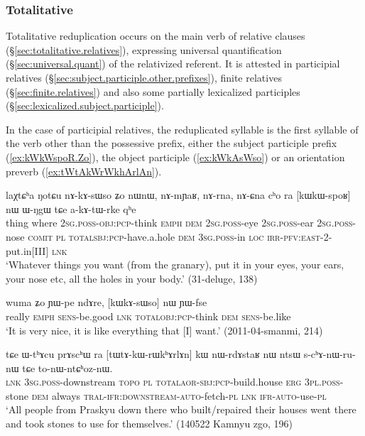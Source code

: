 \subsubsection{Totalitative} \label{sec:totalitative.redp}
Totalitative reduplication occurs on the main verb of relative clauses (§\ref{sec:totalitative.relatives}), expressing universal quantification (§\ref{sec:universal.quant}) of the relativized referent. It is attested in participial relatives (§\ref{sec:subject.participle.other.prefixes}), finite relatives (§\ref{sec:finite.relatives}) and also some partially lexicalized participles (§\ref{sec:lexicalized.subject.participle}).

In the case of participial relatives, the reduplicated syllable is the first syllable of the verb other than the possessive prefix, either the subject participle prefix  (\ref{ex:kWkWspoR.Zo}), the object participle  (\ref{ex:kWkAsWso}) or an orientation preverb (\ref{ex:tWtAkWrWkhArlAn}).

\begin{exe}
\ex \label{ex:kWkWspoR.Zo}
\gll laχtɕʰa ŋotɕu nɤ-kɤ-sɯso ʑo nɯnɯ, nɤ-mɲaʁ, nɤ-rna, nɤ-ɕna cʰo ra [kɯ\redp{}kɯ-spoʁ] nɯ ɯ-ŋgɯ tɕe a-kɤ-tɯ-rke qʰe \\
thing where \textsc{2sg}.\textsc{poss}-\textsc{obj}:\textsc{pcp}-think \textsc{emph} \textsc{dem} \textsc{2sg}.\textsc{poss}-eye \textsc{2sg}.\textsc{poss}-ear \textsc{2sg}.\textsc{poss}-nose \textsc{comit} \textsc{pl} \textsc{total}\redp{}\textsc{sbj}:\textsc{pcp}-have.a.hole \textsc{dem} \textsc{3sg}.\textsc{poss}-in \textsc{loc} \textsc{irr}-\textsc{pfv}:\textsc{east}-2-put.in[III] \textsc{lnk} \\
\glt `Whatever things you want (from the granary), put it in your eyes, your ears, your nose etc, all the holes in your body.' (31-deluge, 138)
\end{exe}

\begin{exe}
\ex \label{ex:kWkAsWso}
\gll wuma ʑo ɲɯ-pe ndɤre, [kɯ\redp{}kɤ-sɯso] nɯ ɲɯ-fse   \\
really \textsc{emph} \textsc{sens}-be.good \textsc{lnk} \textsc{total}\redp{}\textsc{obj}:\textsc{pcp}-think \textsc{dem} \textsc{sens}-be.like  \\
\glt `It is very nice, it is like everything that [I] want.' (2011-04-smanmi, 214)
\end{exe} 

\begin{exe}
\ex \label{ex:tWtAkWrWkhArlAn}
\gll  tɕe ɯ-tʰɤcu prɤscʰɯ ra [tɯ\redp{}tɤ-kɯ-rɯkʰɤrlɤn] kɯ nɯ-rdɤstaʁ nɯ ntsɯ s-cʰɤ-nɯ-ru-nɯ tɕe to-nɯ-ntɕʰoz-nɯ. \\
\textsc{lnk} \textsc{3sg}.\textsc{poss}-downstream  \textsc{topo} \textsc{pl} \textsc{total}\redp{}\textsc{aor}-\textsc{sbj}:\textsc{pcp}-build.house \textsc{erg} \textsc{3pl}.\textsc{poss}-stone \textsc{dem} always \textsc{tral}-\textsc{ifr}:\textsc{downstream}-\textsc{auto}-fetch-\textsc{pl} \textsc{lnk} \textsc{ifr}-\textsc{auto}-use-\textsc{pl} \\
\glt `All people from Praskyu down there who built/repaired their houses went there and took stones to use for themselves.' (140522 Kamnyu zgo, 196)
\end{exe}

